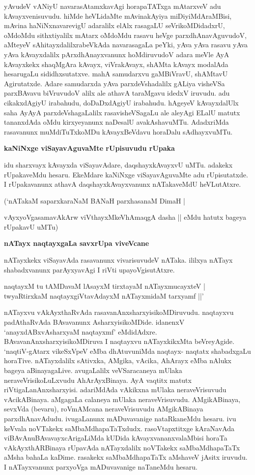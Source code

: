 \noindent
yAvudeV vANiyU navarasAtamxkavAgi horapaTATxga mAtarxveV adu kAvayxvenisuvudu. hiMde heVLidaMte mAvinakAyiya miDiyiMdAraMBisi, mAvina haNiNxnavarevigU adaralilx elAlx rasagaLU seVrikoMDidadxrU, oMdoMdu sithxtiyalilx mAtarx oMdoMdu rasavu heVge parxdhAnavAguvudoV, aMteyeV sAhitayxdalilxrabeVkAda navarasagaLa peYki, yAva yAva rasavu yAva yAva kAvayxdalilx pArxdhAnayxvanunx hoMdiruvudoV adara meVle AyA kAvayxkekx shaqMgAra kAvayx, viVrakAvayx, shAMta kAvayx modalAda hesarugaLu sididhxsutatxve. mahA samudarxvu gaMBiVravU, shAMtavU Agirutatxde. Adare samudarxda yAva parxdeVshadalilx gALiya visheVSa parxBAvavu biVruvudoV alilx ale athavA taraMgavu idedxV iruvudu. adu cikakxdAgiyU irabahudu, doDaDxdAgiyU irabahudu. hAgeyeV kAvayxdalUlx saha AyAyA parxdeVshagaLalilx rasavisheVSagaLu ale aleyAgi ELalU matutx tananxdAda oMdu kirxyeyanunx naDesalU avakAshavuMTu. AdadxriMda rasavanunx muMdiTuTxkoMDu kAvayxBeVdavu horaDalu sAdhayxvuMTu.

{\medskip
\noindent
{\large\bf kaNiNxge viSayavAguvaMte rUpisuvudu rUpaka}}\label{page241}
\smallskip

\noindent
idu sharxvayx kAvayxda viSayavAdare, daqshayxkAvayxvU uMTu. adakekx rUpakaveMdu hesaru. EkeMdare kaNiNxge viSayavAguvaMte adu rUpisutatxde. I rUpakavanunx athavA daqshayxkAvayxvanunx nATakaveMdU heVLutAtxre. 


(`nATakaM saparxkaraNaM\label{241} BANaH parxhasanaM DimaH |

vAyxyoVgasamavAkArw viVthayxMkeVhAmaqgA dasha || eMdu hatutx bageya rUpakavU uMTu)

{\medskip
\noindent
{\large\bf nATayx naqtayxgaLa savxrUpa viveVcane}}\label{page241a}
\smallskip

\noindent
nATayxkekx viSayavAda rasavanunx vivarisuvudeV nATaka. ililxya nATayx shabadxvanunx parAyxyavAgi I riVti upayoVgisutAtxre.

\begin{shloka}
naqtayxM tu tAMDavaM lAsayxM tirxtayaM nATayxmucayxteV |\\\label{241a}
twyaRtirxkaM naqtayxgiVtavAdayxM nATayxmidaM tarxyamf ||\label{241b}'
\end{shloka}

nATayxvu vAkAyxthaRvAda rasavanAnxsharxyisikoMDiruvudu. naqtayxvu padAthaRvAda BAvavanunx AsharxyisikoMDide. idanenxV `anayxdABxvAsharxyaM naqtayxmf'\label{241c} eMdidAdxre. BAvavanAnxsharxyisikoMDiruva I naqtayxvu nATayxkikxMta beVreyAgide. `naqtiV-gAtarx vikeSxVpeV eMba dhAtuvuniMda naqtayx- naqtatx shabadxgaLu horaTive. nATayxdalilx sAtivxka, AMgika, vAcika, AhArayx eMba nAlukx bageya aBinayagaLive. avugaLalilx veVSaracaneya mUlaka neraveVrisikoLuLxvudu AhArAyxBinaya. AyA vaqtitx matutx riVtigaLanAnxsharxyisi. adariMdAda vAkikxna mUlaka neraveVrisuvudu vAcikABinaya. aMgagaLa calaneya mUlaka neraveVrisuvudu. AMgikABinaya, sevxVda (bevaru), roVmAMcana neraveVrisuvudu AMgikABinaya parxdhAnavAdudu. ivugaLanunx mADuvavanige nataRkaneMdu hesaru. ivu keVvala noVTakekx saMbaMdhapaTaTxdudx. rasoVtapxtitxge kAraNavAda viBAvAnuBAvavayxcArigaLiMda kUDida kAvayxvananxvalaMbisi horaTa vAkAyxthARBinaya rUpavAda nATayxdalilx noVTakekx saMbaMdhapaTaTx aMsha bahaLa kaDime. rasakekx saMbaMdhapaTaTx aMshaveV jAsitx iruvudu. I nATayxvanunx parxyoVga mADuvavanige naTaneMdu hesaru.

